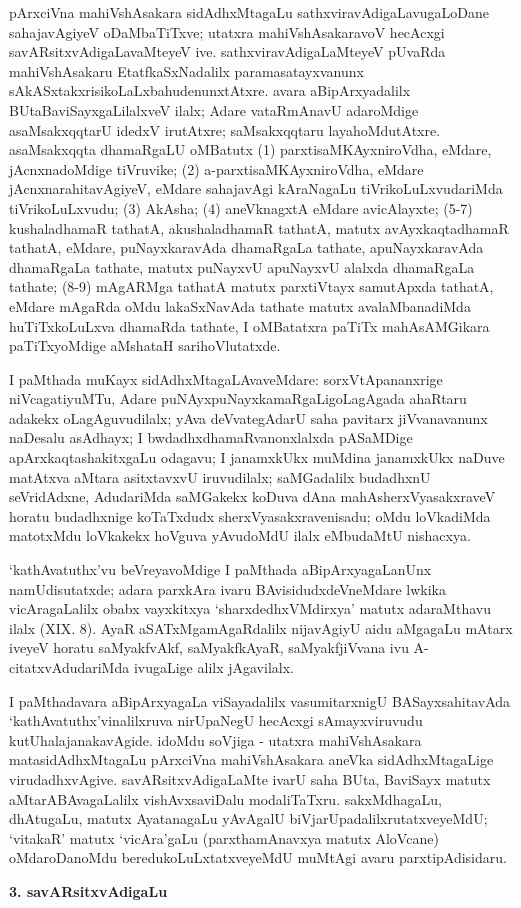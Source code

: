 pArxciVna mahiVshAsakara sidAdhxMtagaLu sathxviravAdigaLavugaLoDane sahajavAgiyeV oDaMbaTiTxve; utatxra mahiVshAsakaravoV hecAcxgi savARsitxvAdigaLavaMteyeV ive. sathxvira\-vAdigaLaMteyeV pUvaRda mahiVshAsakaru EtatfkaSxNadalilx paramasatayxvanunx sAkASxtakxrisi\-koLaLxbahudenunxtAtxre. avara aBipArxyadalilx BUtaBaviSayxgaLilalxveV ilalx; Adare vataR\-mAnavU adaroMdige asaMsakxqqtarU idedxV irutAtxre; saMsakxqqtaru layahoMdutAtxre. asaMsakxqqta dhamaRgaLU oMBatutx
(1) parxtisaMKAyxniroVdha, eMdare, jAcnxnadoMdige tiVruvike;
(2) a-parxtisaMKAyxniroVdha, eMdare jAcnxnarahitavAgiyeV, eMdare sahaja\-vAgi kAraNagaLu tiVrikoLuLxvudariMda tiVrikoLuLxvudu;
(3) AkAsha;
(4) \hbox{aneVknagxtA} eMdare avicAlayxte;
(5-7) kushaladhamaR tathatA, akushaladhamaR tathatA, matutx avAyx\-kaqta\-dhamaR tathatA, eMdare, puNayxkaravAda dhamaRgaLa tathate, apuNayxkaravAda dhamaR\-gaLa tathate, matutx puNayxvU apuNayxvU alalxda dhamaRgaLa tathate; 
(8-9) \hbox{mAgARMga} tathatA matutx parxtiVtayx samutApxda tathatA, eMdare mAgaRda oMdu lakaSxNavAda tathate matutx avalaMbanadiMda huTiTxkoLuLxva dhamaRda tathate, I oMBatatxra paTiTx mahAsAMGi\-kara paTiTxyoMdige aMshataH sarihoVlutatxde.

I paMthada muKayx sidAdhxMtagaLAvaveMdare: sorxVtApananxrige niVcagatiyuMTu, Adare puNAyxpuNayxkamaRgaLigoLagAgada ahaRtaru adakekx oLagAguvudilalx; yAva deVvategAdarU saha pavitarx jiVvanavanunx naDesalu asAdhayx; I bwdadhxdhamaRvanonxlalxda pASaMDige apArxkaqtashakitxgaLu odagavu; I janamxkUkx muMdina janamxkUkx naDuve matAtxva aMtara asitxtavxvU iruvudilalx; saMGadalilx budadhxnU seVridAdxne, AdudariMda saMGakekx koDuva dAna mahAsherxVyasakxraveV horatu budadhxnige koTaTxdudx sherxVyasakxravenisadu; oMdu loVkadiMda matotxMdu loVkakekx hoVguva yAvudoMdU ilalx eMbu\-daMtU nishacxya.

`kathAvatuthx'vu beVreyavoMdige I paMthada aBipArxyagaLanUnx namUdisutatxde; adara parxkAra ivaru BAvisidudxdeVneMdare lwkika vicAragaLalilx obabx vayxkitxya `sharxdedhxVM\-dirxya' matutx adaraMthavu ilalx {\rm (XIX. 8)}. AyaR aSATxMgamAgaRdalilx nija\-vAgiyU aidu aMgagaLu mAtarx iveyeV horatu saMyakfvAkf, saMyakf\-kAyaR, saMyakf\-jiVvana ivu A-citatxvAdudariMda ivugaLige alilx jAgavilalx.

I paMthadavara aBipArxyagaLa viSayadalilx vasumitarxnigU BASayxsahitavAda `kathAvatuthx'vinalilxruva nirUpaNegU hecAcxgi sAmayxviruvudu kutUhalajanakavAgide. idoMdu soVjiga - utatxra mahiVshAsakara matasidAdhxMtagaLu pArxciVna mahiVshAsakara aneVka sidAdhxMtagaLige virudadhxvAgive. savARsitxvAdigaLaMte ivarU saha BUta, BaviSayx matutx aMtarABAvagaLalilx vishAvxsaviDalu modaliTaTxru. sakxMdhagaLu, dhAtugaLu, matutx AyatanagaLu yAvAgalU biVjarUpadalilxrutatxveyeMdU; `vitakaR' matutx `vicAra'gaLu (parxthamAnavxya matutx AloVcane) oMdaroDanoMdu beredukoLuLxtatxveyeMdU muMtAgi avaru parxtipAdisidaru.
\begin{center}
{\textbf{\Large 3. savARsitxvAdigaLu}}
\end{center}

